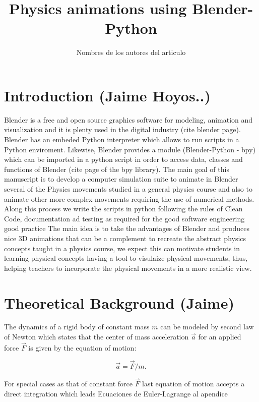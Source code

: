 \documentclass[12pt, letterpaper]{article}
\begin{document}
\title{Physics animations using Blender-Python}
\maketitle %
\author{Nombres de los autores del articulo}


\section{Introduction (Jaime Hoyos..)} 

Blender is a free and open source graphics software for modeling, animation and visualization and it is plenty used in the digital industry (cite blender page). Blender has an embeded Python interpreter which allows to run scripts in a Python enviroment. Likewise, Blender provides a module (Blender-Python - bpy) which can be imported in a python script in order to access data, classes and functions of Blender (cite page of the bpy library).
The main goal of this manuscript is to develop a computer simulation suite to animate in Blender several of the Physics movements studied in a general physics course and also to animate other more complex movements requiring the use of numerical methods. Along this process we write the scripts in python following the rules of Clean Code, documentation ad testing as required for the good software engineering good practice
The main idea is to take the advantages of Blender and produces nice 3D animations that can be a complement to recreate the abstract physics concepts taught in a physics course, we expect this can motivate students in learning physical concepts having a tool to visulaize physical  movements, thus, helping teachers to incorporate the physical movements in a more realistic view.

\section{Theoretical Background (Jaime)}

The dynamics of a rigid body of constant mass $m$ can be modeled by second law of Newton which states that the center of mass acceleration $\vec{a}$ for an applied force $\vec{F}$ is given by the equation of motion:

\begin{equation}
\vec{a}=\vec{F}/m.
\end{equation}

For special cases as that of constant force $\vec{F}$ last equation of motion accepts a direct integration which leads 
Ecuaciones de Euler-Lagrange al apendice
\end{document}
